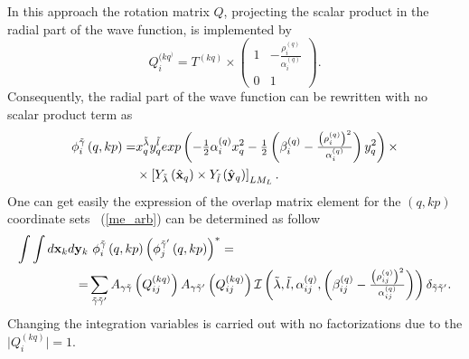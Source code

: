 \documentclass[12pt,a4paper,twoside]{article}
\begin{document}
In this approach the rotation matrix $Q$, projecting the scalar product in the radial part of the wave function, is implemented by
\begin{equation}
Q_i^{(kq^)}= T^{(kq)} \times
\begin{pmatrix}
1 & -\tfrac{\rho^{(q)}_{i}}{\alpha^{(q)}_i} \\ 
0 & 1
\end{pmatrix} .
\end{equation}
Consequently, the radial part of the wave function can be rewritten with no scalar product term as
\begin{align}
\phi_{i}^{\tilde{\gamma} } \left(q, kp \right)  =  &
 x_{q}^{\tilde{\lambda}} y_{q}^{\tilde{l}} exp\left(- \tfrac{1}{2} \alpha^{(q)}_{i} x_{q}^{2} - \tfrac{1}{2} \left(  \beta^{(q)}_{i} - \tfrac{\left(\rho^{(q)}_i\right)^2}{\alpha^{(q)}_i} \right)  y_{q}^{2}  \right) 
\times  \nonumber \\ 
&\times  \left[ Y_{\tilde{\lambda}} \left(  \hat{ \bf x}_q \right) \times Y_{\tilde{l}} \left( \hat{\bf y}_q \right) \right]_{LM_L}.
\end{align}
One can get easily the expression of the overlap matrix element for the $(q,kp)$ coordinate sets ~(\ref{me_arb}) can be determined as follow
\begin{align}
\int \int d{\bf x}_k d{\bf y}_k & ~\phi_{i}^{\tilde{\gamma}}\left(q,kp \right) \left( \phi_{j}^{\tilde{\gamma}^{\prime}}\left(q,kp \right) \right)^{*} =  \nonumber \\
=& \sum_{\tilde{\gamma}\tilde{\gamma}^{\prime}}  
A_{\gamma\tilde{\gamma}}\left( Q_{ij}^{(kq)} \right)
 A_{\gamma\tilde{\gamma}^{\prime}}\left( Q_{ij}^{(kq)} \right) \mathcal{I} \left( \tilde{\lambda}, \tilde{l}, \alpha^{(q)}_{ij}, \left(  \beta^{(q)}_{ij} - \tfrac{\left(\rho^{(q)}_{ij}\right)^2}{\alpha^{(q)}_{ij}} \right) \right) \delta_{\tilde{\gamma}\tilde{\gamma}^{\prime}}.
 \label{projectionMethod}
\end{align}
Changing the integration variables is carried out with no factorizations due to the $\vert Q_i^{(kq)} \vert = 1$.
\end{document}
